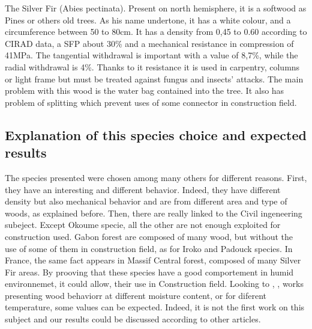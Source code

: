 The Silver Fir (Abies pectinata). Present on north hemisphere, it is a softwood as Pines or others old trees. As his name undertone, it has a white colour, and a circumference between 50 to 80cm. It has a density from 0,45 to 0.60 according to CIRAD data, a SFP about 30\% and a mechanical resistance in compression of 41MPa. The tangential withdrawal is important with a value of 8,7\%, while the radial withdrawal is 4\%. Thanks to it resistance it is used in carpentry, columns or light frame but must be treated against fungus and insects’ attacks. The main problem with this wood is the water bag contained into the tree. It also has problem of splitting which prevent uses of some connector in construction field.


\subsection{Explanation of this species choice and expected results}

The species presented were chosen among many others for different reasons. First, they have an interesting and different behavior. Indeed, they have different density but also mechanical behavior and are from different area and type of woods, as explained before. Then, there are really linked to the Civil ingeneering subeject. Except Okoume specie, all the other are not enough exploited for construction used. Gabon forest are composed of many wood, but without the use of some of them in construction field, as for Iroko and Padouck species. In France, the same fact appears in Massif Central forest, composed of many Silver Fir areas. By prooving that these species have a good comportement in humid environnemet, it could allow, their use in Construction field. Looking to \parencite{ref:Kif1998}, \parencite{ref:Ang2017}, \parencite{ref:Huang2020} works presenting wood behaviorr at different moisture content, or \parencite{ref:Seif2017} for diferent temperature, some values can be expected. Indeed, it is not the first work on this subject and our results could be discussed according to other articles.

